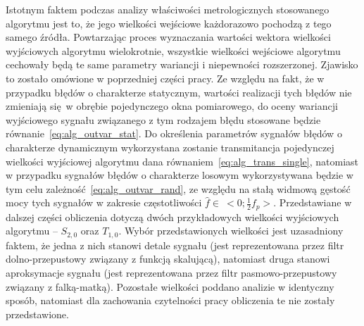 Istotnym faktem podczas analizy właściwości metrologicznych stosowanego algorytmu jest to, że jego wielkości wejściowe każdorazowo pochodzą z tego samego źródła. Powtarzając proces wyznaczania wartości wektora wielkości wyjściowych algorytmu wielokrotnie, wszystkie wielkości wejściowe algorytmu cechowały będą te same parametry wariancji i niepewności rozszerzonej. Zjawisko to zostało omówione w poprzedniej części pracy. Ze względu na fakt, że w przypadku błędów o charakterze statycznym, wartości realizacji tych błędów nie zmieniają się w obrębie pojedynczego okna pomiarowego, do oceny wariancji wyjściowego sygnału związanego z tym rodzajem błędu stosowane będzie równanie~\eqref{eq:alg_outvar_stat}. Do określenia parametrów sygnałów błędów o charakterze dynamicznym wykorzystana zostanie transmitancja pojedynczej wielkości wyjściowej algorytmu dana równaniem~\eqref{eq:alg_trans_single}, natomiast w przypadku sygnałów błędów o charakterze losowym wykorzystywana będzie w tym celu zależność~\eqref{eq:alg_outvar_rand}, ze względu na stałą widmową gęstość mocy tych sygnałów w zakresie częstotliwości $\hat{f} \in~<0;\frac{1}{2} f_{p}>$. Przedstawiane w dalszej części obliczenia dotyczą dwóch przykładowych wielkości wyjściowych algorytmu -- $S_{2,0}$ oraz $T_{1,0}$. Wybór przedstawionych wielkości jest uzasadniony faktem, że jedna z nich stanowi detale sygnału (jest reprezentowana przez filtr dolno-przepustowy związany z funkcją skalującą), natomiast druga stanowi aproksymacje sygnału (jest reprezentowana przez filtr pasmowo-przepustowy związany z falką-matką). Pozostałe wielkości poddano analizie w identyczny sposób, natomiast dla zachowania czytelności pracy obliczenia te nie zostały przedstawione.

